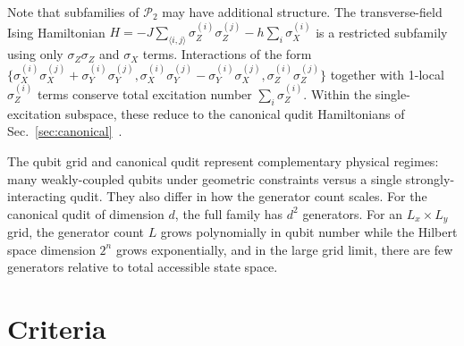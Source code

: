 \documentclass[aps,prx,reprint,superscriptaddress,footnote, twocolumn,notitlepage]{revtex4-2}
\begin{document}
Note that subfamilies of $\mathcal{P}_2$ may have additional structure. The transverse-field Ising Hamiltonian $H = -J \sum_{\langle i,j \rangle} \sigma_Z^{(i)} \sigma_Z^{(j)} - h \sum_i \sigma_X^{(i)}$ is a restricted subfamily using only $\sigma_Z \sigma_Z$ and $\sigma_X$ terms. Interactions of the form $\{\sigma_X^{(i)} \sigma_X^{(j)} + \sigma_Y^{(i)} \sigma_Y^{(j)}, \sigma_X^{(i)} \sigma_Y^{(j)} - \sigma_Y^{(i)} \sigma_X^{(j)}, \sigma_Z^{(i)} \sigma_Z^{(j)}\}$ together with 1-local $\sigma_Z^{(i)}$ terms conserve total excitation number $\sum_i \sigma_Z^{(i)}$. Within the single-excitation subspace, these reduce to the canonical qudit Hamiltonians of Sec.~\ref{sec:canonical}~\cite{wang_symmetry_2012, schirmer_design_2018}.

The qubit grid and canonical qudit represent complementary physical regimes: many weakly-coupled qubits under geometric constraints versus a single strongly-interacting qudit. They also differ in how the generator count scales. For the canonical qudit of dimension $d$, the full family has $d^2$ generators. For an $L_x \times L_y$ grid, the generator count $L$ grows polynomially in qubit number while the Hilbert space dimension $2^n$ grows exponentially, and in the large grid limit, there are few generators relative to total accessible state space.


\section{Criteria}\label{sec:crit}


\end{document}
